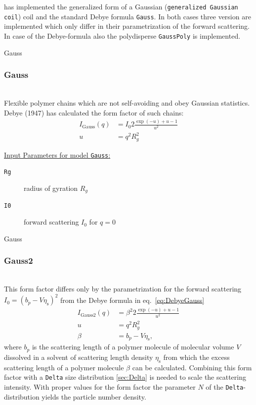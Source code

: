 \SASfit has implemented the generalized form of a Gaussian (\texttt{generalized Gaussian coil}) coil and the standard
Debye formula \texttt{Gauss}. In both cases three version are implemented which only differ in their parametrization of
the forward scattering. In case of the Debye-formula also the polydisperse \texttt{GaussPoly} is implemented.

\textcolor[rgb]{1.00,1.00,1.00}{Gauss}\\
\subsubsection{Gauss }
\label{sect:Gauss}
~\\
Flexible polymer chains which are not self-avoiding
and obey Gaussian statistics. Debye (1947) \cite{Debye1947} has calculated the form factor of such
chains:
\begin{align}
I_\text{Gauss}(q) &= I_0 2\frac{\exp(-u)+u-1}{u^2} \label{eq:DebyeGauss}\\
u &= q^2R_g^2
\end{align}

\vspace{5mm}
\underline{Input Parameters for model \texttt{Gauss}:}
\begin{description}
\item[\texttt{Rg}] radius of gyration $R_g$
\item[\texttt{I0}] forward scattering $I_0$ for $q=0$
\end{description}
\vspace{5mm}

\textcolor[rgb]{1.00,1.00,1.00}{Gauss}\\
\subsubsection{Gauss2}
\label{sect:Gauss2}
~\\
This form factor \cite{Debye1947} differs only by the parametrization for the forward scattering
$I_0=(b_p-V\eta_\text{s})^2$ from the Debye formula in eq.\ \ref{eq:DebyeGauss}
\begin{align}
I_\text{Gauss2}(q) &= \beta^2 2\frac{\exp(-u)+u-1}{u^2} \\
u &= q^2R_g^2 \nonumber \\
\beta &= b_p-V\eta_\text{s}, \nonumber
\end{align}
where $b_p$ is the scattering length of a polymer molecule of molecular volume $V$ dissolved in a solvent
of scattering length density $\eta_\text{s}$ from which the excess scattering length of a polymer molecule
$\beta$ can be calculated. Combining this form factor with a \texttt{Delta} size distribution \ref{sec:Delta}
is needed to scale the scattering intensity. With proper values for the form factor the parameter $N$
of the \texttt{Delta}-distribution yields the particle number density.

